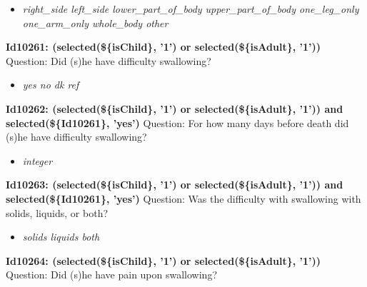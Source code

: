 \documentclass{article}%
\begin{document}
%
\begin{itemize}%
\item%
\textit{right\_side\newline%
 left\_side\newline%
 lower\_part\_of\_body\newline%
 upper\_part\_of\_body\newline%
 one\_leg\_only\newline%
 one\_arm\_only\newline%
 whole\_body\newline%
 other\newline%
}%
\end{itemize}%
\textbf{Id10261: (selected(\$\{isChild\}, '1') or selected(\$\{isAdult\}, '1'))\newline%
}%
Question: Did (s)he have difficulty swallowing?\newline%
%
\begin{itemize}%
\item%
\textit{yes\newline%
 no\newline%
 dk\newline%
 ref\newline%
}%
\end{itemize}%
\textbf{Id10262: (selected(\$\{isChild\}, '1') or selected(\$\{isAdult\}, '1')) and selected(\$\{Id10261\}, 'yes')\newline%
}%
Question: For how many days before death did (s)he have difficulty swallowing?\newline%
%
\begin{itemize}%
\item%
\textit{integer\newline%
}%
\end{itemize}%
\textbf{Id10263: (selected(\$\{isChild\}, '1') or selected(\$\{isAdult\}, '1')) and selected(\$\{Id10261\}, 'yes')\newline%
}%
Question: Was the difficulty with swallowing with solids, liquids, or both?\newline%
%
\begin{itemize}%
\item%
\textit{solids\newline%
 liquids\newline%
 both\newline%
}%
\end{itemize}%
\textbf{Id10264: (selected(\$\{isChild\}, '1') or selected(\$\{isAdult\}, '1'))\newline%
}%
Question: Did (s)he have pain upon swallowing?\newline%
\end{document}
